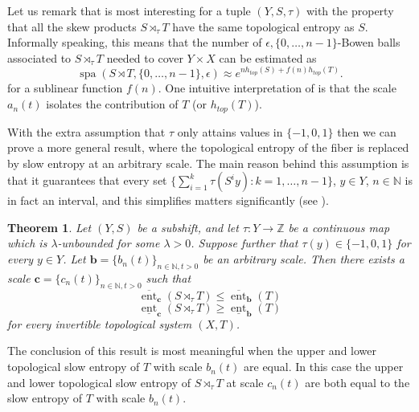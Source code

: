 \documentclass[a4paper,oneside]{amsart}
\renewcommand{\(}{\begin{dmath*}}
\renewcommand{\)}{\end{dmath*}}
\newtheorem{theorem}{Theorem}[section]
\theoremstyle{definition}
\newcommand{\N}{\mathbb{N}}
\newcommand{\Z}{\mathbb{Z}}
\newcommand{\upperent}{\overline{\operatorname{ent}}}
\newcommand{\lowerent}{\underline{\operatorname{ent}}}
\newcommand{\spa}{\operatorname{spa}}
\begin{document}
  Let us remark that  is most interesting for a tuple $(Y,S,\tau)$ with the property that all the skew products $S\rtimes_\tau T$ have the same topological entropy as $S$. Informally speaking, this means that the number of $\epsilon,\{0,\dots,n-1\}$-Bowen balls associated to $S\rtimes_\tau T$ needed to cover $Y\times X$ can be estimated as
\[\spa(S\rtimes T,\{0,\dots,n-1\},\epsilon)\approx e^{nh_{top}(S)+f(n)h_{top}(T)}.\]
for a sublinear function $f(n)$. One intuitive interpretation of  is that the scale $a_n(t)$ isolates the contribution of $T$ (or $h_{top}(T)$).

With the extra assumption that $\tau$ only attains values in $\{-1,0,1\}$ then we can prove a more general result, where the topological entropy of the fiber is replaced by slow entropy at an arbitrary scale. The main reason behind this assumption is that it guarantees that every set $\{\sum_{i=1}^k \tau(S^i y ) : k=1,\dots,n-1\}$, $y\in Y$, $n\in\N$ is in fact an interval, and this simplifies matters significantly (see ).
\begin{theorem}\label{thm:slow-entropy}
Let $(Y,S)$ be a subshift, and let $\tau\colon Y\to \Z$ be a continuous map which is $\lambda$-unbounded for some $\lambda>0$. Suppose further that $\tau(y)\in\{-1,0,1\}$ for every $y\in Y$. Let $\textbf{b}=\{b_n(t)\}_{n\in\N,t>0}$ be an arbitrary scale. Then there exists a scale $\textbf{c}=\{c_n(t)\}_{n\in\N,t>0}$ such that
\[\upperent_{\textbf{c}}(S\rtimes_\tau T)\leq\upperent_{\textbf{b}}(T)\]  \[\lowerent_{\textbf{c}}(S\rtimes_\tau T)\geq \lowerent_{\textbf{b}}(T)\] 
for every invertible topological system $(X,T)$.
\end{theorem}
The conclusion of this result is most meaningful when the upper and lower topological slow entropy of $T$ with scale $b_n(t)$ are equal. In this case the upper and lower topological slow entropy of $S\rtimes_\tau T$ at scale $c_n(t)$ are both equal to the slow entropy of $T$ with scale $b_n(t)$.
\end{document}
